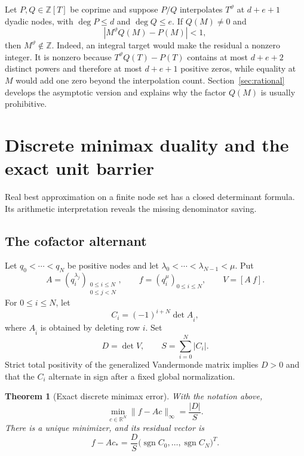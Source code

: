 \documentclass[11pt,oneside]{article}
\newtheorem{theorem}{Theorem}[section]
\theoremstyle{definition}
\theoremstyle{remark}
\newcommand{\Z}{\mathbb Z}
\newcommand{\R}{\mathbb R}
\newcommand{\sgn}{\operatorname{sgn}}
\newcommand{\thetaq}{\vartheta}
\begin{document}
Let $P,Q\in\Z[T]$ be coprime and suppose $P/Q$ interpolates $T^{\thetaq}$ at
$d+e+1$ dyadic nodes, with $\deg P\le d$ and $\deg Q\le e$.  If $Q(M)\ne0$ and
\begin{equation}
 |M^{\thetaq}Q(M)-P(M)|<1,
 \label{eq:rational-finite-cert}
\end{equation}
then $M^{\thetaq}\notin\Z$.  Indeed, an integral target would make the residual a nonzero
integer.  It is nonzero because
$T^{\thetaq}Q(T)-P(T)$ contains at most $d+e+2$ distinct powers and therefore at most
$d+e+1$ positive zeros, while equality at $M$ would add one zero beyond the interpolation
count.  Section~\ref{sec:rational} develops the asymptotic version and explains why the factor
$Q(M)$ is usually prohibitive.

\section{Discrete minimax duality and the exact unit barrier}
\label{sec:minimax}

Real best approximation on a finite node set has a closed determinant formula.  Its
arithmetic interpretation reveals the missing denominator saving.

\subsection{The cofactor alternant}

Let $q_0<\cdots<q_N$ be positive nodes and let
$\lambda_0<\cdots<\lambda_{N-1}<\mu$.  Put
\[
 A=(q_i^{\lambda_j})_{\substack{0\le i\le N\\0\le j<N}},
 \qquad
 f=(q_i^\mu)_{0\le i\le N},
 \qquad
 V=[A\ f].
\]
For $0\le i\le N$, let
\[
 C_i=(-1)^{i+N}\det A_{\widehat i},
\]
where $A_{\widehat i}$ is obtained by deleting row $i$.  Set
\[
 D=\det V,
 \qquad
 S=\sum_{i=0}^N|C_i|.
\]
Strict total positivity of the generalized Vandermonde matrix implies $D>0$ and that the
$C_i$ alternate in sign after a fixed global normalization.

\begin{theorem}[Exact discrete minimax error]
\label{thm:cofactor-minimax}
With the notation above,
\begin{equation}
 \min_{c\in\R^N}\|f-Ac\|_\infty=\frac{|D|}{S}.
 \label{eq:minimax-cofactor}
\end{equation}
There is a unique minimizer, and its residual vector is
\begin{equation}
 f-Ac_* = \frac{D}{S}\bigl(\sgn C_0,\ldots,\sgn C_N\bigr)^T.
 \label{eq:alternating-residual}
\end{equation}
\end{theorem}
\end{document}
